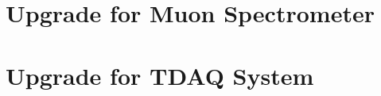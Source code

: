 \clearpage
\section{Upgrade for Muon Spectrometer} \label{sec:MuonUpgrade}

\section{Upgrade for TDAQ System} \label{sec:TDAQUpgrade}

